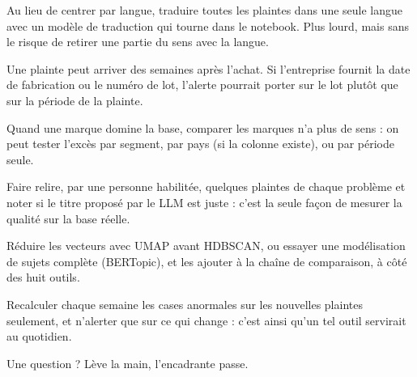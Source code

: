 \begin{tcbraster}[raster columns=2, raster equal height, raster column skip=8pt, raster row skip=8pt]
\begin{conceptbox}[title={\faLanguage\ Traduire avant de comparer}, unbreakable]
\small Au lieu de centrer par langue, traduire toutes les plaintes dans une seule langue avec un modèle de
traduction qui tourne dans le notebook. Plus lourd, mais sans le risque de retirer une partie du sens avec
la langue.
\end{conceptbox}
\begin{conceptbox}[title={\faCalendar*\ La date de l'événement}, unbreakable]
\small Une plainte peut arriver des semaines après l'achat. Si l'entreprise fournit la date de fabrication
ou le numéro de lot, l'alerte pourrait porter sur le lot plutôt que sur la période de la plainte.
\end{conceptbox}
\begin{conceptbox}[title={\faStore\ D'autres cases que la marque}, unbreakable]
\small Quand une marque domine la base, comparer les marques n'a plus de sens : on peut tester l'excès par
segment, par pays (si la colonne existe), ou par période seule.
\end{conceptbox}
\begin{conceptbox}[title={\faUserCheck\ Une évaluation humaine}, unbreakable]
\small Faire relire, par une personne habilitée, quelques plaintes de chaque problème et noter si le titre
proposé par le LLM est juste : c'est la seule façon de mesurer la qualité sur la base réelle.
\end{conceptbox}
\begin{conceptbox}[title={\faProjectDiagram\ D'autres regroupements}, unbreakable]
\small Réduire les vecteurs avec UMAP avant HDBSCAN, ou essayer une modélisation de sujets complète
(BERTopic), et les ajouter à la chaîne de comparaison, à côté des huit outils.
\end{conceptbox}
\begin{conceptbox}[title={\faBell\ Une alerte au fil de l'eau}, unbreakable]
\small Recalculer chaque semaine les cases anormales sur les nouvelles plaintes seulement, et n'alerter
que sur ce qui change : c'est ainsi qu'un tel outil servirait au quotidien.
\end{conceptbox}
\end{tcbraster}

\vfill
\begin{center}\color{slate}\small
\faUserTie\quad Une question ? Lève la main, l'encadrante passe.
\end{center}
